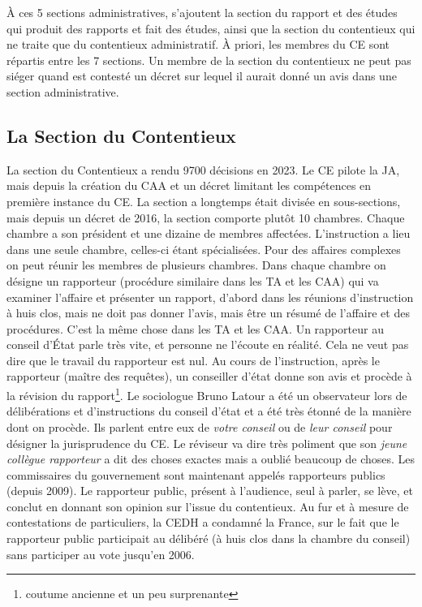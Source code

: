 \documentclass[math]{cours}
\begin{document}
À ces 5 sections administratives, s'ajoutent la section du rapport et des études qui produit des rapports et fait des études,
ainsi que la section du contentieux qui ne traite que du contentieux administratif.
À priori, les membres du CE sont répartis entre les 7 sections.
Un membre de la section du contentieux ne peut pas siéger quand est contesté un décret sur lequel il aurait donné un avis dans une section administrative.

\subsection{La Section du Contentieux}
La section du Contentieux a rendu 9700 décisions en 2023.
Le CE pilote la JA, mais depuis la création du CAA et un décret limitant les compétences en première instance du CE.
La section a longtemps était divisée en sous-sections, mais depuis un décret de 2016, la section comporte plutôt 10 chambres.
Chaque chambre a son président et une dizaine de membres affectées.
L'instruction a lieu dans une seule chambre, celles-ci étant spécialisées.
Pour des affaires complexes on peut réunir les membres de plusieurs chambres.
Dans chaque chambre on désigne un rapporteur (procédure similaire dans les TA et les CAA) qui va examiner l'affaire et présenter un rapport, d'abord dans les réunions d'instruction à huis clos, mais ne doit pas donner l'avis, mais être un résumé de l'affaire et des procédures.
C'est la même chose dans les TA et les CAA.
Un rapporteur au conseil d'État parle très vite, et personne ne l'écoute en réalité.
Cela ne veut pas dire que le travail du rapporteur est nul.
Au cours de l'instruction, après le rapporteur (maître des requêtes), un conseiller d'état donne son avis et procède à la révision du rapport\footnote{coutume ancienne et un peu surprenante}.
Le sociologue Bruno Latour a été un observateur lors de délibérations et d'instructions du conseil d'état et a été très étonné de la manière dont on procède.
Ils parlent entre eux de \textit{votre conseil} ou de \textit{leur conseil} pour désigner la jurisprudence du CE.
Le réviseur va dire très poliment que son \textit{jeune collègue rapporteur} a dit des choses exactes mais a oublié beaucoup de choses.
Les commissaires du gouvernement sont maintenant appelés rapporteurs publics (depuis 2009).
Le rapporteur public, présent à l'audience, seul à parler, se lève, et conclut en donnant son opinion sur l'issue du contentieux.
Au fur et à mesure de contestations de particuliers, la CEDH a condamné la France, sur le fait que le rapporteur public participait au délibéré (à huis clos dans la chambre du conseil) sans participer au vote jusqu'en 2006.
\end{document}
